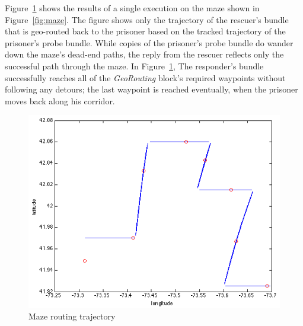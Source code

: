 Figure~\ref{fig:mazeExperiment} shows the results of a single
execution on the maze shown in Figure~\ref{fig:maze}. The figure shows
only the trajectory of the rescuer's bundle that is geo-routed back to
the prisoner based on the tracked trajectory of the prisoner's probe
bundle. While copies of the prisoner's probe bundle do wander down the
maze's dead-end paths, the reply from the rescuer reflects only the
successful path through the maze. In Figure~\ref{fig:mazeExperiment},
The responder's bundle successfully reaches all of the {\em
  GeoRouting} block's required waypoints without following any
detours; the last waypoint is reached eventually, when the prisoner
moves back along his corridor.
\begin{figure}
\begin{center}
\includegraphics[width=.8\columnwidth]{figures/mazeExperiment.png}
\end{center}
\vspace{-.75cm}
\caption{Maze routing trajectory}
\label{fig:mazeExperiment}
\vspace{-.5cm}
\end{figure}